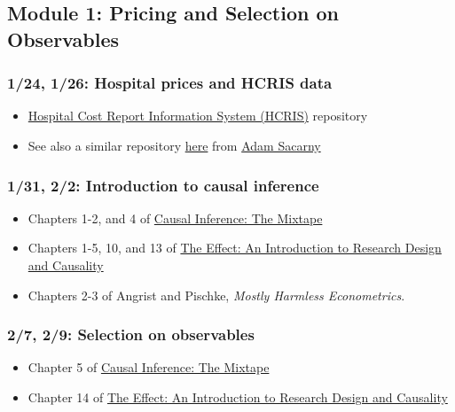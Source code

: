 \documentclass[11pt,]{article}
\providecommand{\tightlist}{%
  \setlength{\itemsep}{0pt}\setlength{\parskip}{0pt}}
\begin{document}
\hypertarget{module-1-pricing-and-selection-on-observables}{%
\subsection{Module 1: Pricing and Selection on
Observables}\label{module-1-pricing-and-selection-on-observables}}

\hypertarget{hospital-prices-and-hcris-data}{%
\subsubsection{1/24, 1/26: Hospital prices and HCRIS
data}\label{hospital-prices-and-hcris-data}}

\begin{itemize}
\tightlist
\item
  \href{https://github.com/imccart/HCRIS}{Hospital Cost Report
  Information System (HCRIS)} repository
\item
  See also a similar repository
  \href{https://github.com/asacarny/hospital-cost-reports}{here} from
  \href{http://sacarny.com/}{Adam Sacarny}
\end{itemize}

\hypertarget{introduction-to-causal-inference}{%
\subsubsection{1/31, 2/2: Introduction to causal
inference}\label{introduction-to-causal-inference}}

\begin{itemize}
\tightlist
\item
  Chapters 1-2, and 4 of \href{https://mixtape.scunning.com/}{Causal
  Inference: The Mixtape}
\item
  Chapters 1-5, 10, and 13 of \href{https://theeffectbook.net/}{The
  Effect: An Introduction to Research Design and Causality}
\item
  Chapters 2-3 of Angrist and Pischke, \emph{Mostly Harmless
  Econometrics}.
\end{itemize}

\hypertarget{selection-on-observables}{%
\subsubsection{2/7, 2/9: Selection on
observables}\label{selection-on-observables}}

\begin{itemize}
\tightlist
\item
  Chapter 5 of \href{https://mixtape.scunning.com/}{Causal Inference:
  The Mixtape}
\item
  Chapter 14 of \href{https://theeffectbook.net/}{The Effect: An
  Introduction to Research Design and Causality}
\end{itemize}
\end{document}
